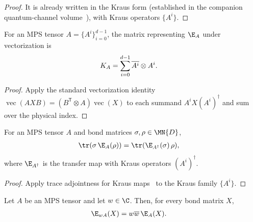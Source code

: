 \begin{proof}\leanok
    It is already written in the Kraus form
    (established in the companion quantum-channel volume~\cite[``Completely positive map'']{QICLean2026Blueprint}), with Kraus operators
    $\{A^i\}$.
\end{proof}


\begin{theorem}
    \label{thm:mps_transfer_matrix_kraus_sum}
    \leanok
    For an MPS tensor $A=\{A^i\}_{i=0}^{d-1}$, the matrix representing
    $\E_A$ under vectorization is
    \begin{align}
        K_A & =\sum_{i=0}^{d-1}\overline{A^i}\otimes A^i.
        \notag
    \end{align}
\end{theorem}

\begin{proof}\leanok
    Apply the standard vectorization identity
    $\operatorname{vec}(AXB)=(B^{\mathsf T}\otimes A)\operatorname{vec}(X)$
    to each summand $A^iX(A^i)^\dagger$ and sum over the physical index.
\end{proof}

\begin{lemma}
    \label{lem:trace_mul_transfer_map_adjoint}
    \leanok
    For an MPS tensor $A$ and bond matrices $\sigma, \rho\in\MN{D}$,
    \begin{align}
        \tr(\sigma\,\E_A(\rho)) & = \tr(\E_{A^\dagger}(\sigma)\,\rho),
        \notag
    \end{align}
    where $\E_{A^\dagger}$ is the transfer map with Kraus operators $(A^i)^\dagger$.
\end{lemma}

\begin{proof}\leanok
    Apply trace adjointness for Kraus maps~\cite[``Trace adjointness of a Kraus map'']{QICLean2026Blueprint} to the Kraus family $\{A^i\}$.
\end{proof}

\begin{lemma}
    \label{lem:transfer_map_smul}
    \leanok
    Let $A$ be an MPS tensor and let $w\in\C$. Then, for every bond matrix $X$,
    \begin{align}
        \E_{wA}(X) & =w\overline w\,\E_A(X).
        \notag
    \end{align}
\end{lemma}

